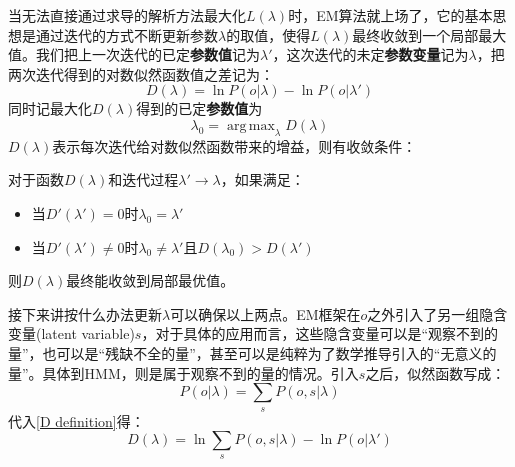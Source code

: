 \documentclass[11pt,a4paper]{article}
\DeclareMathOperator*{\argmax}{arg\,max}
\numberwithin{equation}{section}
\begin{document}
当无法直接通过求导的解析方法最大化$ L(\lambda) $时，EM算法就上场了，它的基本思想是通过迭代的方式不断更新参数$ \lambda $的取值，使得$ L(\lambda) $最终收敛到一个局部最大值。我们把上一次迭代的已定\textbf{参数值}记为$ \lambda' $，这次迭代的未定\textbf{参数变量}记为$ \lambda $，把两次迭代得到的对数似然函数值之差记为：
\begin{equation}\label{D definition}
D(\lambda) = \ln P(o | \lambda) - \ln P(o | \lambda')
\end{equation}
同时记最大化$ D(\lambda) $得到的已定\textbf{参数值}为
\begin{equation}\label{lambda_0 definition}
\lambda_0 = \argmax_{\lambda} D(\lambda)
\end{equation}
$ D(\lambda) $表示每次迭代给对数似然函数带来的增益，则有收敛条件：
\begin{proposition}\label{converge condition}
对于函数$ D(\lambda) $和迭代过程$ \lambda' \rightarrow \lambda $，如果满足：
\begin{itemize}
\item 当$ D'(\lambda') = 0 $时$ \lambda_0 = \lambda' $
\item 当$D'(\lambda') \neq 0 $时$ \lambda_0 \neq \lambda' $且$ D(\lambda_0) > D(\lambda') $
\end{itemize}
则$ D(\lambda) $最终能收敛到局部最优值。
\end{proposition}

接下来讲按什么办法更新$ \lambda $可以确保以上两点。EM框架在$ o $之外引入了另一组隐含变量(latent variable)$ s $，对于具体的应用而言，这些隐含变量可以是“观察不到的量”，也可以是“残缺不全的量”，甚至可以是纯粹为了数学推导引入的“无意义的量”。具体到HMM，则是属于观察不到的量的情况。引入$ s $之后，似然函数写成：
\begin{equation}
P(o | \lambda) = \sum_s P(o, s | \lambda)
\end{equation}
代入\eqref{D definition}得：
\begin{equation}
D(\lambda) = \ln \sum_s P(o, s | \lambda) - \ln P(o | \lambda')
\end{equation}
\end{document}
